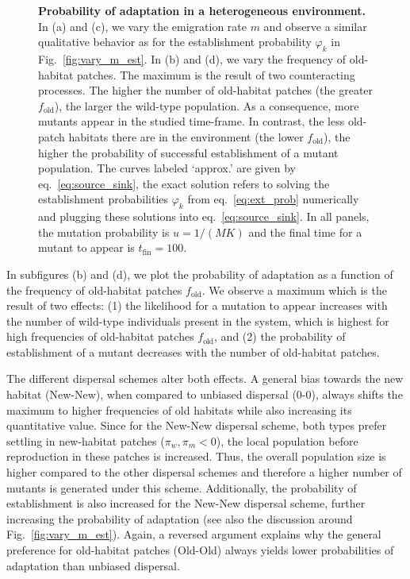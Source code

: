 \documentclass[11pt]{article}
\newcommand{\chg}[1]{\textcolor{change}{#1}}
\begin{document}
\begin{figure}[t!]
	\caption{\textbf{Probability of adaptation in a heterogeneous environment.} \small In (a) and (c), we vary the emigration rate $m$ and observe a similar qualitative behavior as for the establishment probability $\varphi_k$ in Fig.~\ref{fig:vary_m_est}. In (b) and (d), we vary the frequency of old-habitat patches. The maximum is the result of two counteracting processes. The higher the number of old-habitat patches (the greater $f_{\text{old}}$), the larger the wild-type population. As a consequence, more mutants appear in the studied time-frame. In contrast, the less old-patch habitats there are in the environment (the lower $f_{\text{old}}$), the higher the probability of successful establishment of a mutant population. The curves labeled `approx.' are given by eq.~\eqref{eq:source_sink}, the exact solution refers to solving the establishment probabilities $\varphi_k$ from eq.~\eqref{eq:ext_prob} numerically and plugging these solutions into eq.~\eqref{eq:source_sink}. In all panels, the mutation probability is $u=1/(M K)$ and the final time for a mutant to appear is $t_{\text{fin}}=100$. }
	\label{fig:source_sink}
\end{figure}

In subfigures (b) and (d), we plot the probability of adaptation as a function of the frequency of old-habitat patches $f_{\text{old}}$. We observe a maximum which is the result of two effects: (1) the likelihood for a mutation to appear increases with the number of wild-type individuals present in the system, which is highest for high frequencies of old-habitat patches $f_{\text{old}}$, and (2) the probability of establishment of a mutant decreases with the number of old-habitat patches. 

The different dispersal schemes alter both effects. \chg{A general bias towards the new habitat (New-New)}, when compared to \chg{unbiased} dispersal (0-0), always shifts the maximum to higher frequencies of old habitats while also increasing its quantitative value. \chg{Since for the New-New dispersal scheme, both types prefer settling in new-habitat patches ($\pi_w,\pi_m<0$), the local population before reproduction in these patches is increased. Thus, the overall population size is higher compared to the other dispersal schemes and therefore a higher number of mutants is generated under this scheme.} Additionally, the probability of establishment is also increased for \chg{the New-New} dispersal scheme, further increasing the probability of adaptation (see also the discussion around Fig.~\ref{fig:vary_m_est}). Again, a reversed argument explains why \chg{the general preference for old-habitat patches (Old-Old)} always yields lower probabilities of adaptation than \chg{unbiased} dispersal.  
\end{document}
